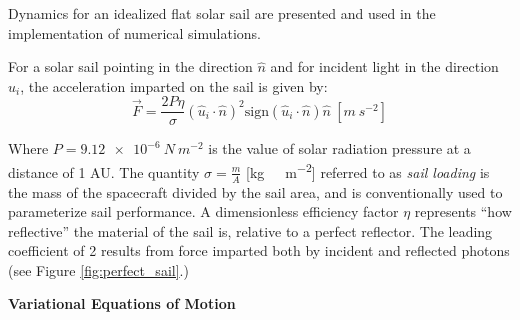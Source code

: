 Dynamics for an idealized flat solar sail are presented and used in the implementation of numerical simulations.

For a solar sail pointing in the direction \(\hat{n}\) and for incident light in the direction \(\hat{u}_i\), the acceleration imparted on the sail is given by:
\begin{equation}
  \vec{F} = \frac{2 P \eta}{\sigma}(\hat{u}_i \cdot \hat{n})^2 \mathrm{sign}(\hat{u}_i \cdot \hat{n}) \hat{n}
  \ [\unit{m\ s^{-2}}] \label{eq:solar_force}
\end{equation}

Where \(P = \qty{9.12e-6}{N\ m^{-2}}\) is the value of solar radiation pressure at a distance of 1 AU. The quantity \(\sigma = \frac{m}{A}\) [\unit{kg\ m^{-2}}] referred to as \textit{sail loading} is the mass of the spacecraft divided by the sail area, and is conventionally used to parameterize sail performance. A dimensionless efficiency factor \(\eta\) represents ``how reflective'' the material of the sail is, relative to a perfect reflector. The leading coefficient of 2 results from force imparted both by incident and reflected photons (see Figure \ref{fig:perfect_sail}.)

\textbf{Variational Equations of Motion}

